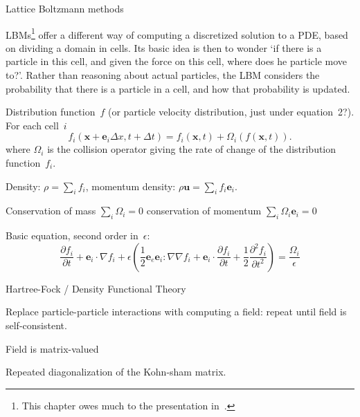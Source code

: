 
 {Lattice Boltzmann methods}

\acfp{LBM}\footnote{This chapter owes much to the presentation
  in~\cite{ChenDoolen:LBM}.}  offer a different way of computing a
discretized solution to a \ac{PDE}, based on dividing a domain in
cells. Its basic idea is then to wonder `if there is a particle in
this cell, and given the force on this cell, where does he particle
move to?'. Rather than reasoning about actual particles, the \ac{LBM}
considers the probability that there is a particle in a cell, and how
that probability is updated.

Distribution function~$f$ (or particle velocity distribution, just
under equation~2?).  For each cell~$i$
\[ f_i(\mathbf{x}+\mathbf{e}_i\Delta x,t+\Delta t) 
    = f_i(\mathbf{x},t)+\Omega_i(f(\mathbf{x},t)).
\]
where $\Omega_i$ is the collision operator giving
the rate of change of the distribution function~$f_i$.

Density: $\rho=\sum_i f_i$,
momentum density: $\rho\mathbf{u}=\sum_if_i\mathbf{e}_i$.

Conservation of mass $\sum_i\Omega_i=0$
conservation of momentum $\sum_i\Omega_i\mathbf{e}_i=0$


Basic equation, second order in~$\epsilon$:
\[
  \frac{\partial f_i}{\partial t} + \mathbf{e}_i\cdot \nabla f_i +
  \epsilon\left(
    \frac12 \mathbf{e}_e\mathbf{e}_i\colon \nabla\nabla f_i +
    \mathbf{e}_i\cdot\frac{\partial f_i}{\partial t} +
    \frac12 \frac{\partial^2f_i}{\partial t^2}
  \right) = \frac{\Omega_i}{\epsilon}
\]


 {Hartree-Fock / Density Functional Theory}

Replace particle-particle interactions with computing a field: 
repeat until field is self-consistent.

Field is matrix-valued

Repeated diagonalization of the Kohn-sham matrix.

